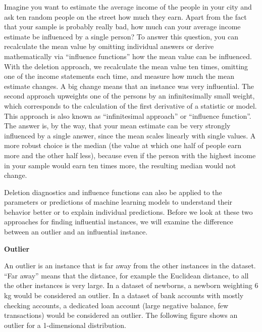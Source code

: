 \documentclass[
  11pt,
]{scrbook}
\begin{document}
Imagine you want to estimate the average income of the people in your city and ask ten random people on the street how much they earn.
Apart from the fact that your sample is probably really bad, how much can your average income estimate be influenced by a single person?
To answer this question, you can recalculate the mean value by omitting individual answers or derive mathematically via ``influence functions'' how the mean value can be influenced.
With the deletion approach, we recalculate the mean value ten times, omitting one of the income statements each time, and measure how much the mean estimate changes.
A big change means that an instance was very influential.
The second approach upweights one of the persons by an infinitesimally small weight, which corresponds to the calculation of the first derivative of a statistic or model.
This approach is also known as ``infinitesimal approach'' or ``influence function''.
The answer is, by the way, that your mean estimate can be very strongly influenced by a single answer, since the mean scales linearly with single values.
A more robust choice is the median (the value at which one half of people earn more and the other half less), because even if the person with the highest income in your sample would earn ten times more, the resulting median would not change.

Deletion diagnostics and influence functions can also be applied to the parameters or predictions of machine learning models to understand their behavior better or to explain individual predictions.
Before we look at these two approaches for finding influential instances, we will examine the difference between an outlier and an influential instance.

\textbf{Outlier}

An outlier is an instance that is far away from the other instances in the dataset.
``Far away'' means that the distance, for example the Euclidean distance, to all the other instances is very large.
In a dataset of newborns, a newborn weighting 6 kg would be considered an outlier.
In a dataset of bank accounts with mostly checking accounts, a dedicated loan account (large negative balance, few transactions) would be considered an outlier.
The following figure shows an outlier for a 1-dimensional distribution.
\end{document}
